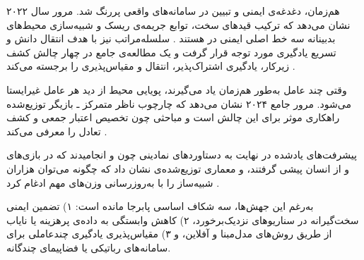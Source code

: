 هم‌زمان، دغدغه‌ی ایمنی و تبیین در سامانه‌های واقعی پررنگ شد. مرور سال ۲۰۲۲ نشان می‌دهد که ترکیب قیدهای سخت، توابع جریمه‌ی ریسک و شبیه‌سازی محیط‌های بدبینانه سه خط اصلی ایمنی در  هستند \cite{JMLR:v16:garcia15a}. سلسله‌مراتب نیز با هدف انتقال دانش و تسریع یادگیری مورد توجه قرار گرفت و یک مطالعه‌ی جامع در 
 چهار چالش کشف زیرکار، یادگیری اشتراک‌پذیر، انتقال و مقیاس‌پذیری را برجسته می‌کند \cite{Ghazalpour2021HRLsurvey}. %


وقتی چند عامل به‌طور هم‌زمان یاد می‌گیرند، پویایی محیط از دید هر عامل غیرایستا می‌شود. مرور جامع ۲۰۲۴ نشان می‌دهد که چارچوب ناظر متمرکز ـ بازیگر توزیع‌شده
 راهکاری موثر برای این چالش است و مباحثی چون تخصیص اعتبار جمعی و کشف تعادل را معرفی می‌کند \cite{Song2024MARLsurvey}. %


پیشرفت‌های یادشده در نهایت به دستاوردهای نمادینی چون  \cite{Silver2016AlphaGo} و  \cite{Vinyals2019AlphaStar} انجامیدند که در بازی‌های  و  از انسان پیشی گرفتند، و معماری توزیع‌شده‌ی  نشان داد که چگونه می‌توان هزاران شبیه‌ساز را با به‌روزرسانی وزن‌های مهم ادغام کرد \cite{Espeholt2018IMPALA}. %


به‌رغم این جهش‌ها، سه شکاف اساسی پابرجا مانده است: ۱) تضمین ایمنی سخت‌گیرانه در سناریوهای نزدیک‌برخورد، ۲) کاهش وابستگی به داده‌ی پرهزینه یا نایاب از طریق روش‌های مدل‌مبنا و آفلاین، و ۳) مقیاس‌پذیری یادگیری چندعاملی برای سامانه‌های رباتیکی یا فضاپیمای چندگانه. 
